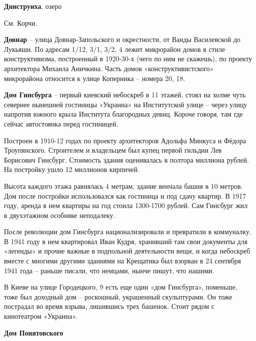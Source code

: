 \medskip

\textbf{Дниструиха}, озеро

См. Корчи.\\

\medskip

\textbf{Довнар} – улица Довнар-Запольского и окре\-стности, от Ванды Василевской до Лукьяши. По адресам 1/12, 3/1, 3/2, 4 лежит микрорайон домов в стиле конструктивизма, построенный в 1920-30-х (чего по ним не скажешь), по проекту архитектора Михаила Аничкина. Часть домов «конструктивистского» микрорайона относится к улице Коперника – номера 20, 18.\\

\medskip

\textbf{Дом Гинсбурга} – первый киевский небоскреб в 11 этажей, стоял на холме чуть севернее нынешней гостиницы «Украина» на Институтской улице – через улицу напротив южного крыла Института благородных девиц. Короче говоря, там где сейчас автостоянка перед гостиницей. 

Построен в 1910-12 годах по проекту архитекторов Адольфа Минкуса и Фёдора Троупянского. Строителем и владельцем был купец первой гильдии Лев Борисович Гинсбург. Стоимость здания оценивалась в полтора миллиона рублей. На постройку ушло 12 миллионов кирпичей. 

Высота каждого этажа равнялась 4 метрам, здание венчала башня в 10 метров. Дом после постройки использовался как гостиница и под сдачу квартир. В 1917 году, аренда в нем квартиры на год стоила 1300-1700 рублей. Сам Гинсбург жил в двухэтажном особняке неподалеку.

После революции дом Гинсбурга национализировали и превратили в коммуналку. В 1941 году в нем квартировал Иван Кудря, хранивший там свои документы для «легенды» и прочие важные в подпольной деятельности вещи, и когда небоскреб вместе с многими другими зданиями на Крещатика был взорван в 24 сентября 1941 года – раньше писали, что немцами, нынче пишут, что нашими.
 
В Киеве на улице Городецкого, 9 есть еще один «дом Гинсбурга», поменьше, тоже был доходный дом – роскошный, украшенный скульптурами. Он тоже пострадал во время взрыва, лишившись трех башенок. Стоит рядом с кинотеатром «Украина».\\


\medskip


\textbf{Дом Понятовского}


